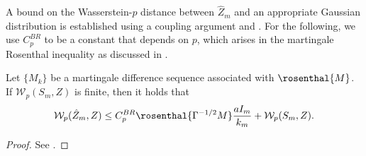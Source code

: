 \documentclass[11pt]{article}
\begin{document}
A bound on the Wasserstein-$p$ distance between $\hat{Z}_m$ and an appropriate Gaussian distribution is established using a coupling argument and . 
For the following, we use $C_p^{BR}$ to be a constant that depends on $p$, which arises in the martingale Rosenthal inequality as discussed in . 
\begin{lemma}\label{lem:martingale_clt_weighted}
   Let $\{M_k\}$ be a martingale difference sequence associated with $\rosenthal{M}$. 
   If $\mathcal{W}_{p} (S_m, Z)$ is finite, then it holds that
   \begin{equation}\label{eq:martingale_clt_weighted}
        \mathcal{W}_{p} (\hat{Z}_m, Z) 
        \leq 
        C_{p}^{BR} \rosenthal{\Gamma^{-1/2} M} \frac{aI_m}{k_m} 
        +
        \mathcal{W}_{p} (S_m, Z) . 
   \end{equation}
\end{lemma}
\begin{proof}
    See .
\end{proof}
\end{document}
